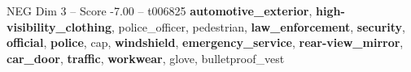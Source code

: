 \begin{textsample}{NEG Dim 3 – Score -7.00 – t006825}  \label{ex:f3_neg_012}
\textbf{automotive\_exterior}, \textbf{high-visibility\_clothing}, police\_officer, pedestrian, \textbf{law\_enforcement}, \textbf{security}, \textbf{official}, \textbf{police}, cap, \textbf{windshield}, \textbf{emergency\_service}, \textbf{rear-view\_mirror}, \textbf{car\_door}, \textbf{traffic}, \textbf{workwear}, glove, bulletproof\_vest

\end{textsample}
